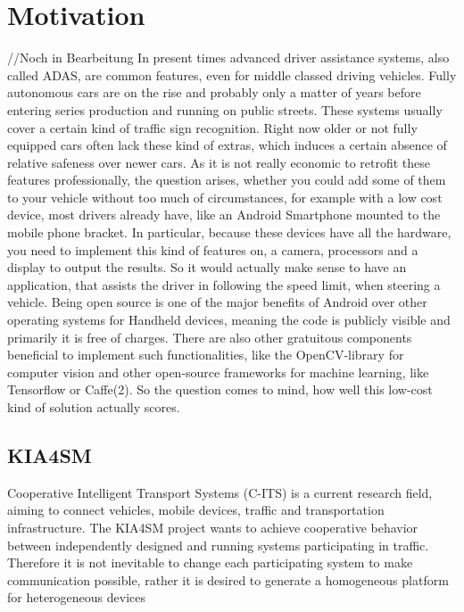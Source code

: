 
\chapter{Motivation}\label{chapter:motivation}
//Noch in Bearbeitung
In present times advanced driver assistance systems, also called ADAS, are common features, even for middle classed driving vehicles. Fully autonomous cars are on the rise and probably only a matter of years before entering series production and running on public streets. These systems usually cover a certain kind of traffic sign recognition. Right now older or not fully equipped cars often lack these kind of extras, which induces a certain absence of relative safeness over newer cars. As it is not really economic to retrofit these features professionally, the question arises, whether you could add some of them to your vehicle without too much of circumstances, for example with a low cost device, most drivers already have, like an Android Smartphone mounted to the mobile phone bracket. In particular, because these devices have all the hardware, you need to implement this kind of features on, a camera, processors and a display to output the results. So it would actually make sense to have an application, that assists the driver in following the speed limit, when steering a vehicle. \newline
Being open source is one of the major benefits of Android over other operating systems for Handheld devices, meaning the code is publicly visible and primarily it is free of charges. There are also other gratuitous components beneficial to implement such functionalities, like the OpenCV-library for computer vision and other open-source frameworks for machine learning, like Tensorflow or Caffe(2). So the question comes to mind, how well this low-cost kind of solution actually scores. 

\section{KIA4SM}
Cooperative Intelligent Transport Systems (C-ITS) is a current research field, aiming to connect vehicles, mobile devices, traffic and transportation infrastructure\cite{kia4sm}. The KIA4SM project wants to achieve cooperative behavior between independently designed and running systems participating in traffic. Therefore it is not inevitable to change each participating system to make communication possible, rather it is desired to generate a homogeneous platform for heterogeneous
devices


